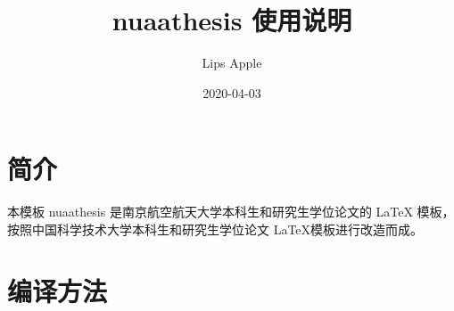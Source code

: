 \documentclass[a4paper]{ltxdoc}
\DeclareRobustCommand\cls{\textsf}
\begin{document}
\title{\cls{nuaathesis} 使用说明}
\author{Lips Apple}
\date{2020-04-03}
\maketitle



\section{简介}

本模板 \cls{nuaathesis} 是南京航空航天大学本科生和研究生学位论文的 \LaTeX{}
模板，按照中国科学技术大学本科生和研究生学位论文 \LaTeX{}模板进行改造而成。

\section{编译方法}
\end{document}
